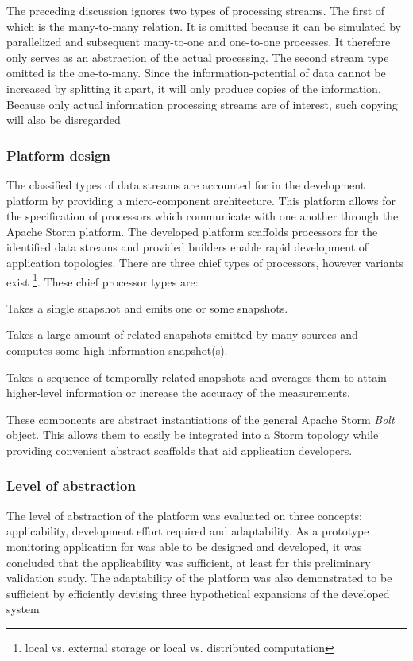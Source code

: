 The preceding discussion ignores two types of processing streams. The first of which is the many-to-many relation. It is omitted because it can be simulated by parallelized and subsequent many-to-one and one-to-one processes. It therefore only serves as an abstraction of the actual processing. The second stream type omitted is the one-to-many. Since the information-potential of data cannot be increased by splitting it apart, it will only produce copies of the information. Because only actual information processing streams are of interest, such copying will also be disregarded

\subsubsection{Platform design}
The classified types of data streams are accounted for in the development platform by providing a micro-component architecture. This platform allows for the specification of processors which communicate with one another through the Apache Storm platform. The developed platform scaffolds processors for the identified data streams and provided builders enable rapid development of application topologies. There are three chief types of processors, however variants exist \footnote{local vs. external storage or local vs. distributed computation}. These chief processor types are:
\begin{description}[style=nextline]
\nospace
\item[SingleMessageProcessor]Takes a single snapshot and emits one or some snapshots.
\item[AccumulatorProcessor]Takes a large amount of related snapshots emitted by many sources and computes some high-information snapshot(s).
\item[BufferedProcessor]Takes a sequence of temporally related snapshots and averages them to attain higher-level information or increase the accuracy of the measurements.
\end{description}
These components are abstract instantiations of the general Apache Storm \emph{Bolt} object. This allows them to easily be integrated into a Storm topology while providing convenient abstract scaffolds that aid application developers.

\subsubsection{Level of abstraction}
The level of abstraction of the platform was evaluated on three concepts: applicability, development effort required and adaptability. As a prototype monitoring application for \nedapidsystems was able to be designed and developed, it was concluded that the applicability was sufficient, at least for this preliminary validation study. The adaptability of the platform was also demonstrated to be sufficient by efficiently devising three hypothetical expansions of the developed system

